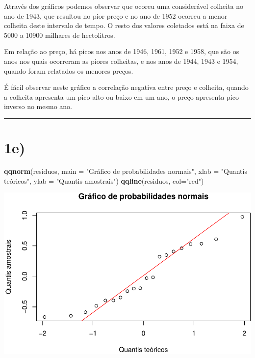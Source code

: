\documentclass[11pt,]{article}
\makeatletter
\newenvironment{Shaded}{\begin{snugshade}}{\end{snugshade}}
\newcommand{\KeywordTok}[1]{\textcolor[rgb]{0.13,0.29,0.53}{\textbf{{#1}}}}
\newcommand{\DataTypeTok}[1]{\textcolor[rgb]{0.13,0.29,0.53}{{#1}}}
\newcommand{\StringTok}[1]{\textcolor[rgb]{0.31,0.60,0.02}{{#1}}}
\newcommand{\NormalTok}[1]{{#1}}
\def\maxwidth{\ifdim\Gin@nat@width>\linewidth\linewidth
\else\Gin@nat@width\fi}
\let\Oldincludegraphics\includegraphics
\renewcommand{\includegraphics}[1]{\Oldincludegraphics[width=\maxwidth]{#1}}
\makeatother
\begin{document}
Através dos gráficos podemos observar que ocoreu uma considerável
colheita no ano de 1943, que resultou no pior preço e no ano de 1952
ocorreu a menor colheita deste intervalo de tempo. O resto dos valores
coletados está na faixa de 5000 a 10900 milhares de hectolitros.

Em relação ao preço, há picos nos anos de 1946, 1961, 1952 e 1958, que
são os anos nos quais ocorreram as piores colheitas, e nos anos de 1944,
1943 e 1954, quando foram relatados os menores preços.

É fácil observar neste gráfico a correlação negativa entre preço e
colheita, quando a colheita apresenta um pico alto ou baixo em um ano, o
preço apresenta pico inverso no mesmo ano.

\begin{center}\rule{0.5\linewidth}{\linethickness}\end{center}

\section{1e)}\label{e}

\begin{Shaded}
\begin{Highlighting}[]
\KeywordTok{qqnorm}\NormalTok{(residuos, }
       \DataTypeTok{main =} \StringTok{"Gráfico de probabilidades normais"}\NormalTok{, }
       \DataTypeTok{xlab =} \StringTok{"Quantis teóricos"}\NormalTok{, }
       \DataTypeTok{ylab =} \StringTok{"Quantis amostrais"}\NormalTok{)}
\KeywordTok{qqline}\NormalTok{(residuos, }\DataTypeTok{col=}\StringTok{"red"}\NormalTok{)}
\end{Highlighting}
\end{Shaded}

\includegraphics{versaofinal_lista3_files/figure-latex/unnamed-chunk-6-1.pdf}
\end{document}
